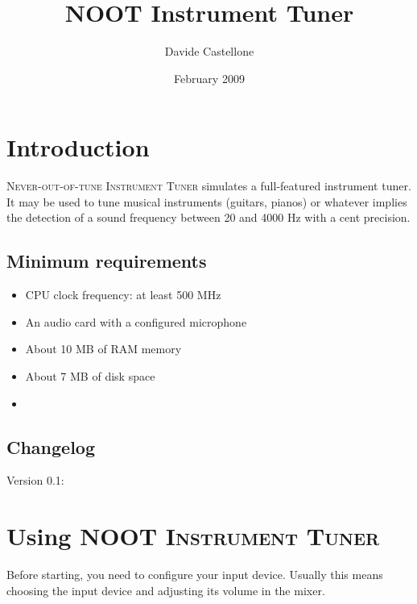 \newcommand{\noun}[1]{\textsc{#1}}

\makeindex


\author{Davide Castellone}
\title{NOOT Instrument Tuner}
\date{February 2009}
\maketitle
\tableofcontents

\pagestyle{fancyplain}%

\chapter{Introduction}\label{introduction}

\noun{Never-out-of-tune Instrument Tuner} simulates a full-featured instrument tuner. It may
be used to tune musical instruments (guitars, pianos) or whatever
implies the detection of a sound frequency between 20 and 4000 Hz with a cent precision.

\section{Minimum requirements}\label{requirements}

\begin{itemize}
\item CPU clock frequency: at least 500 MHz
\item An audio card with a configured microphone
\item About 10 MB of RAM memory
\item About 7 MB of disk space
\item
\end{itemize}

\section{Changelog}\label{changelog}

Version 0.1:


\chapter{Using \noun{NOOT Instrument Tuner}}\label{gettingstarted}

Before starting, you need to configure your input device.
Usually this means choosing the input device and adjusting
its volume in the mixer.

